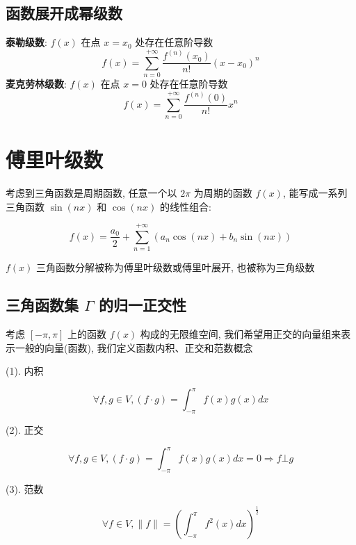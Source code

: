 \subsection{函数展开成幂级数}

\begin{definition}
	\textbf{泰勒级数}: $f(x)$ 在点 $x=x_{0}$ 处存在任意阶导数
	$$f(x)=\sum\limits_{n=0}^{+\infty}\frac{f^{(n)}(x_{0})}{n!}(x-x_{0})^n$$
	\textbf{麦克劳林级数}: $f(x)$ 在点 $x=0$ 处存在任意阶导数
	$$f(x)=\sum\limits_{n=0}^{+\infty}\frac{f^{(n)}(0)}{n!}x^n$$
\end{definition}
\section{傅里叶级数}

\begin{definition}[傅里叶级数]\label{def: 傅里叶级数}
	考虑到三角函数是周期函数, 任意一个以 $2\pi$ 为周期的函数 $f(x)$, 能写成一系列三角函数 $\sin (nx)$ 和 $\cos (nx)$ 的线性组合:

	$$f(x) = \dfrac{a_{0}}{2} + \sum\limits_{n=1}^{+\infty}(a_{n}\cos (nx)+b_{n}\sin (nx))$$

	$f(x)$ 三角函数分解被称为傅里叶级数或傅里叶展开, 也被称为三角级数 
\end{definition}
\subsection{三角函数集 $\Gamma$ 的归一正交性}
\begin{definition}[内积、正交和范数]
	考虑 $[-\pi,\pi]$ 上的函数 $f(x)$ 构成的无限维空间, 我们希望用正交的向量组来表示一般的向量(函数), 我们定义函数内积、正交和范数概念

	(1). 内积
	
	$$\forall f,g \in V, (f\cdot g) = \int_{-\pi}^{\pi}f(x)g(x)dx $$

	(2). 正交

	$$\forall f,g \in V, (f\cdot g) = \int_{-\pi}^{\pi}f(x)g(x)dx = 0\Rightarrow f \bot g $$

	(3). 范数

	$$\forall f \in V, \parallel f \parallel  = \left(\int_{-\pi}^{\pi}f^{2}(x)dx\right)^{\frac{1}{2}}$$
\end{definition}

